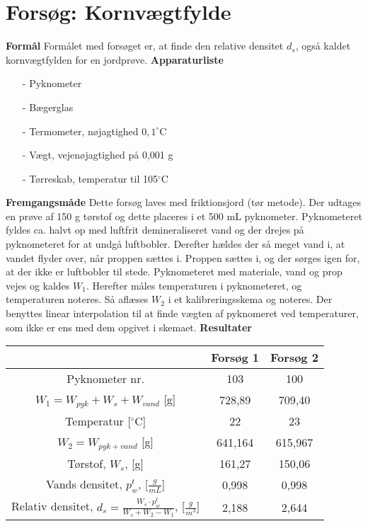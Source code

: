 \chapter{Forsøg: Kornvægtfylde}
\textbf{Formål}
\newline
Formålet med forsøget er, at finde den relative densitet $d_{s}$, også kaldet kornvægtfylden for en jordprøve. 
\newline
\newline
\textbf{Apparaturliste}
\begin{itemize}
\item[-] Pyknometer
\item[-] Bægerglas
\item[-] Termometer, nøjagtighed $0,1^{\circ}$C
\item[-] Vægt, vejenøjagtighed på 0,001 g
\item[-] Tørreskab, temperatur til 105$^{\circ}$C
\end{itemize}

\textbf{Fremgangsmåde}
\newline
Dette forsøg laves med friktionsjord (tør metode). Der udtages en prøve af 150 g tørstof og dette placeres i et 500 mL pyknometer. Pyknometeret fyldes ca. halvt op med luftfrit demineraliseret vand og der drejes på pyknometeret for at undgå luftbobler. Derefter hældes der så meget vand i, at vandet flyder over, når proppen sættes i. Proppen sættes i, og der sørges igen for, at der ikke er luftbobler til stede. Pyknometeret med materiale, vand og prop vejes og kaldes $W_{1}$. Herefter måles temperaturen i pyknometeret, og temperaturen noteres. Så aflæses $W_{2}$ i et kalibreringsskema og noteres. Der benyttes linear interpolation til at finde vægten af pyknomeret ved temperaturer, som ikke er ens med dem opgivet i skemaet. 
\newline
\newline
\textbf{Resultater}
\begin{center}
	\begin{tabular}{ |c|c|c| } 
		\hline
		 & Forsøg 1 & Forsøg 2 \\	\hline
		Pyknometer nr. & 103 & 100 \\	\hline
		$W_1=W_{pyk} + W_s + W_{vand}$ [g] & 728,89 & 709,40 \\	\hline 
		Temperatur [$^{\circ}$C] & 22 & 23 \\ \hline
		$W_2=W_{pyk+vand}$ [g] & 641,164 & 615,967 \\	\hline
		Tørstof, $W_s$, [g] & 161,27 & 150,06 \\	\hline
		Vands densitet, $p_{w}^t$, [$\frac{g}{mL}$] & 0,998 & 0,998 \\	\hline
		Relativ densitet, $d_s=\frac{W_s\cdot p_{w}^t}{W_s + W_2 - W_1}$, [$\frac{g}{m^3}$] & 2,188 & 2,644	\\	\hline	
	\end{tabular}
\end{center}

